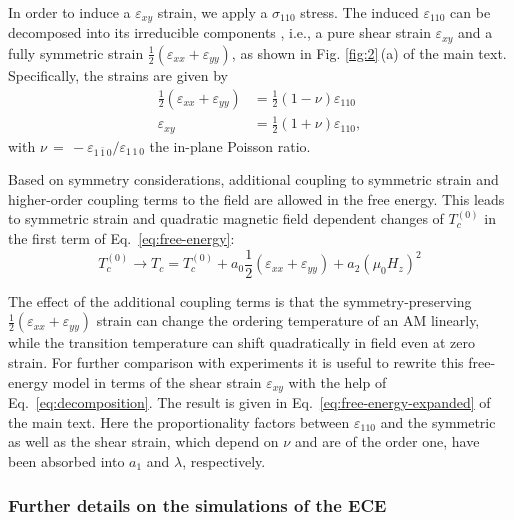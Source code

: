 \documentclass[
 reprint,










 amsmath,amssymb,
 aps,






]{revtex4-2}
\begin{document}
In order to induce a $\varepsilon_{xy}$ strain, we apply a $\sigma_{110}$ stress. The induced $\varepsilon_{110}$ can be decomposed into its irreducible components \cite{Ike18}, i.e., a pure shear strain $\varepsilon_{xy}$ and a fully symmetric strain $\frac{1}{2}(\varepsilon_{xx}+\varepsilon_{yy})$, as shown in Fig. \ref{fig:2}\,(a) of the main text. Specifically, the strains are given by
\begin{equation} \label{eq:decomposition}
\begin{aligned}
    \frac{1}{2}(\varepsilon_{xx}+\varepsilon_{yy}) &= \frac{1}{2} (1 - \nu) \varepsilon_{110} \\
    \varepsilon_{xy} &= \frac{1}{2} (1 + \nu) \varepsilon_{110},
\end{aligned}
\end{equation}
with $\nu\,=\,-\varepsilon_{1\,\bar{1}\,0}/\varepsilon_{1\,1\,0}$ the in-plane Poisson ratio.

Based on symmetry considerations, additional coupling to symmetric strain and higher-order coupling terms to the field are allowed in the free energy. This leads to symmetric strain and quadratic magnetic field dependent changes of $T_c^{(0)}$ in the first term of Eq.~\eqref{eq:free-energy}:
\begin{equation}
    T_c^{(0)}\rightarrow T_c=T_c^{(0)}+a_0 \frac{1}{2}(\varepsilon_{xx}+\varepsilon_{yy})+a_2 (\mu_0H_z)^2
\end{equation}





The effect of the additional coupling terms is that the symmetry-preserving $\frac{1}{2}(\varepsilon_{xx}+\varepsilon_{yy})$ strain can change the ordering temperature of an AM linearly, while the transition temperature can shift quadratically in field even at zero strain. For further comparison with experiments it is useful to rewrite this free-energy model in terms of the shear strain $\varepsilon_{xy}$ with the help of Eq.~\eqref{eq:decomposition}. The result is given in Eq.~\eqref{eq:free-energy-expanded} of the main text. Here the proportionality factors between $\varepsilon_{110}$ and the symmetric as well as the shear strain, which depend on $\nu$ and are of the order one, have been absorbed into $a_1$ and $\lambda$, respectively.

\subsubsection{Further details on the simulations of the ECE}
\label{sec:simulations}
\end{document}
